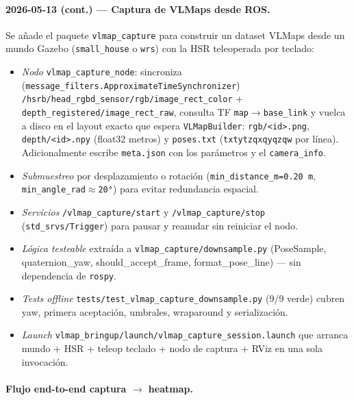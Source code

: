 \documentclass[11pt,a4paper]{article}
\begin{document}
\paragraph{2026-05-13 (cont.) — Captura de VLMaps desde ROS.}

Se añade el paquete \texttt{vlmap\_capture} para construir un dataset
VLMaps desde un mundo Gazebo (\texttt{small\_house} o \texttt{wrs}) con la
HSR teleoperada por teclado:

\begin{itemize}
  \item \emph{Nodo} \texttt{vlmap\_capture\_node}: sincroniza
        (\texttt{message\_filters.ApproximateTimeSynchronizer})
        \texttt{/hsrb/head\_rgbd\_sensor/rgb/image\_rect\_color} +
        \texttt{depth\_registered/image\_rect\_raw}, consulta TF
        \texttt{map$\to$base\_link} y vuelca a disco en el layout
        exacto que espera \texttt{VLMapBuilder}:
        \texttt{rgb/<id>.png}, \texttt{depth/<id>.npy} (float32 metros) y
        \texttt{poses.txt} (\texttt{tx\;ty\;tz\;qx\;qy\;qz\;qw} por línea).
        Adicionalmente escribe \texttt{meta.json} con los parámetros y
        el \texttt{camera\_info}.
  \item \emph{Submuestreo} por desplazamiento o rotación
        (\texttt{min\_distance\_m=0.20\,m}, \texttt{min\_angle\_rad$\approx$20°})
        para evitar redundancia espacial.
  \item \emph{Servicios} \texttt{/vlmap\_capture/start} y
        \texttt{/vlmap\_capture/stop} (\texttt{std\_srvs/Trigger}) para
        pausar y reanudar sin reiniciar el nodo.
  \item \emph{Lógica testeable} extraída a
        \texttt{vlmap\_capture/downsample.py} (PoseSample, quaternion\_yaw,
        should\_accept\_frame, format\_pose\_line) — sin dependencia de
        \texttt{rospy}.
  \item \emph{Tests offline} \texttt{tests/test\_vlmap\_capture\_downsample.py}
        (9/9 verde) cubren yaw, primera aceptación, umbrales, wraparound y
        serialización.
  \item \emph{Launch} \texttt{vlmap\_bringup/launch/vlmap\_capture\_session.launch}
        que arranca mundo + HSR + teleop teclado + nodo de captura + RViz
        en una sola invocación.
\end{itemize}

\paragraph{Flujo end-to-end captura $\to$ heatmap.}
\end{document}
